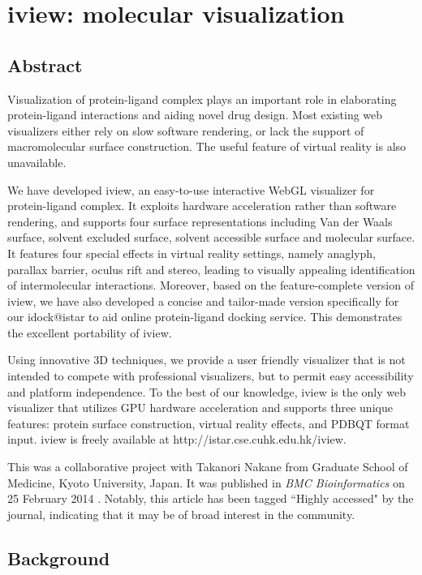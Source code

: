 \chapter{iview: molecular visualization}
\label{iview}

\section{Abstract}

Visualization of protein-ligand complex plays an important role in elaborating protein-ligand interactions and aiding novel drug design. Most existing web visualizers either rely on slow software rendering, or lack the support of macromolecular surface construction. The useful feature of virtual reality is also unavailable.

We have developed iview, an easy-to-use interactive WebGL visualizer for protein-ligand complex. It exploits hardware acceleration rather than software rendering, and supports four surface representations including Van der Waals surface, solvent excluded surface, solvent accessible surface and molecular surface. It features four special effects in virtual reality settings, namely anaglyph, parallax barrier, oculus rift and stereo, leading to visually appealing identification of intermolecular interactions. Moreover, based on the feature-complete version of iview, we have also developed a concise and tailor-made version specifically for our idock@istar to aid online protein-ligand docking service. This demonstrates the excellent portability of iview.

Using innovative 3D techniques, we provide a user friendly visualizer that is not intended to compete with professional visualizers, but to permit easy accessibility and platform independence. To the best of our knowledge, iview is the only web visualizer that utilizes GPU hardware acceleration and supports three unique features: protein surface construction, virtual reality effects, and PDBQT format input. iview is freely available at http://istar.cse.cuhk.edu.hk/iview.

This was a collaborative project with Takanori Nakane from Graduate School of Medicine, Kyoto University, Japan. It was published in \textit{BMC Bioinformatics} on 25 February 2014 \citep{1366}. Notably, this article has been tagged ``Highly accessed" by the journal, indicating that it may be of broad interest in the community.

\section{Background}


